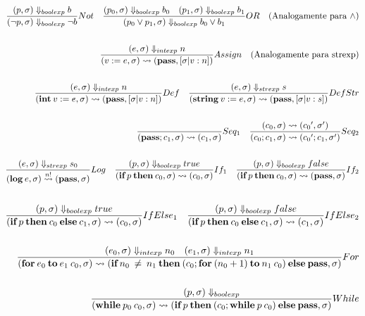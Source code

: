 \documentclass{article}
\begin{document}
\begin{align*}
    \frac{(p,\sigma)\Downarrow _{boolexp} b}
         {(\neg p, \sigma)\Downarrow _{boolexp} \neg b} Not \quad 
    \frac{(p_0,\sigma)\Downarrow _{boolexp} b_0 \quad (p_1,\sigma)\Downarrow _{boolexp} b_1}
         {(p_0 \vee p_1, \sigma)\Downarrow _{boolexp} b_0 \vee b_1} OR \quad (\text{Analogamente para }\wedge) \\~\\
    \frac{(e,\sigma)\Downarrow _{intexp} n}
         {(v:=e,\sigma) \mathrel{\leadsto} (\textbf{pass},[\sigma|v:n])} Assign \quad (\text{Analogamente para strexp}) \\~\\
    \frac{(e,\sigma)\Downarrow _{intexp} n}
         {(\textbf{int}\:v:=e,\sigma) \mathrel{\leadsto} (\textbf{pass},[\sigma|v:n])} Def \quad 
    \frac{(e,\sigma)\Downarrow _{strexp} s}
         {(\textbf{string}\:v:=e,\sigma) \mathrel{\leadsto} (\textbf{pass},[\sigma|v:s])} DefStr \\~\\
    \frac{}{(\textbf{pass};c_1,\sigma) \mathrel{\leadsto} (c_1,\sigma)} Seq_1 \quad 
    \frac{(c_0,\sigma) \mathrel{\leadsto} ({c_0}',{\sigma}')}
         {(c_0;c_1,\sigma) \mathrel{\leadsto} ({c_0}';c_1,{\sigma}')} Seq_2 \\~\\
    \frac{(e,\sigma)\Downarrow _{strexp} s_0}
         {(\textbf{log} \: e,\sigma) \overset{n!}{\mathrel{\leadsto}} (\textbf{pass},\sigma)} Log \quad
    \frac{(p,\sigma) \Downarrow _{boolexp} true}
         {(\textbf{if} \: p \: \textbf{then} \: c_0,\sigma) \mathrel{\leadsto} (c_0,\sigma)}If_1 \quad 
    \frac{(p,\sigma)\Downarrow _{boolexp} false}
         {(\textbf{if} \: p \: \textbf{then}\: c_0,\sigma) \mathrel{\leadsto} (\textbf{pass},\sigma)}If_2 \\~\\
\end{align*}
\newpage
\begin{align*}
    \frac{(p,\sigma)\Downarrow _{boolexp} true}
         {(\textbf{if}\: p\: \textbf{then}\: c_0\: \textbf{else}\: c_1,\sigma) \mathrel{\leadsto} (c_0,\sigma)}IfElse_1 \quad
    \frac{(p,\sigma)\Downarrow _{boolexp} false}
         {(\textbf{if}\: p\: \textbf{then}\: c_0\: \textbf{else}\: c_1,\sigma) \mathrel{\leadsto} (c_1,\sigma)}IfElse_2 \\~\\
    \frac{(e_0,\sigma) \Downarrow _{intexp} n_0 \quad (e_1,\sigma)\Downarrow _{intexp} n_1}
         {(\textbf{for}\: e_0 \: \textbf{to} \: e_1 \: c_0,\sigma) \mathrel{\leadsto} (\textbf{if}\: n_0 \: \ne \: n_1 \: \textbf{then} \: (c_0;\textbf{for} \: (n_0 + 1) \: \textbf{to}\: n_1 \: c_0) \:\textbf{else}\: \textbf{pass},\sigma)}For \\~\\    
    \frac{(p,\sigma) \Downarrow _{boolexp}}
         {(\textbf{while}\: p_0 \: c_0,\sigma) \mathrel{\leadsto} (\textbf{if}\: p \: \textbf{then} \: (c_0;\textbf{while} \: p \: c_0) \:\textbf{else}\: \textbf{pass},\sigma)}While         
\end{align*}
\end{document}
